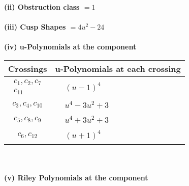 \documentclass[1p]{elsarticle_modified}
\theoremstyle{definition}
\begin{document}
\flushleft \textbf{(ii) Obstruction class $= 1$}\\~\\
\flushleft \textbf{(iii) Cusp Shapes $= 4 u^2-24$}\\~\\
\newpage\renewcommand{\arraystretch}{1}
\flushleft \textbf{(iv) u-Polynomials at the component}\newline \\
\begin{tabular}{m{50pt}|m{274pt}}
Crossings & \hspace{64pt}u-Polynomials at each crossing \\
\hline $$\begin{aligned}c_{1},c_{2},c_{7}\\c_{11}\end{aligned}$$&$\begin{aligned}
&(u-1)^4
\end{aligned}$\\
\hline $$\begin{aligned}c_{3},c_{4},c_{10}\end{aligned}$$&$\begin{aligned}
&u^4-3 u^2+3
\end{aligned}$\\
\hline $$\begin{aligned}c_{5},c_{8},c_{9}\end{aligned}$$&$\begin{aligned}
&u^4+3 u^2+3
\end{aligned}$\\
\hline $$\begin{aligned}c_{6},c_{12}\end{aligned}$$&$\begin{aligned}
&(u+1)^4
\end{aligned}$\\
\hline
\end{tabular}\\~\\
\newpage\renewcommand{\arraystretch}{1}
\flushleft \textbf{(v) Riley Polynomials at the component}\newline \\
\end{document}
